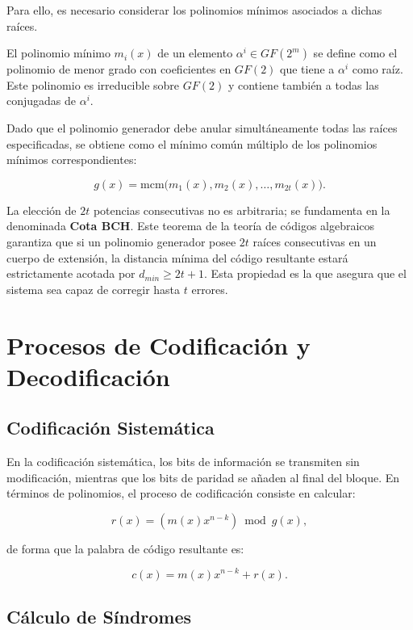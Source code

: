 Para ello, es necesario considerar los polinomios mínimos asociados a dichas raíces.

El polinomio mínimo \(m_i(x)\) de un elemento \(\alpha^i \in GF(2^m)\) se define como el polinomio de menor grado con coeficientes en \(GF(2)\) que tiene a \(\alpha^i\) como raíz. Este polinomio es irreducible sobre \(GF(2)\) y contiene también a todas las conjugadas de \(\alpha^i\).

Dado que el polinomio generador debe anular simultáneamente todas las raíces especificadas, se obtiene como el mínimo común múltiplo de los polinomios mínimos correspondientes:

\begin{equation}
g(x) = \mathrm{mcm}\big(m_1(x), m_2(x), \dots, m_{2t}(x)\big).
\end{equation}

La elección de $2t$ potencias consecutivas no es arbitraria; se fundamenta en la denominada \textbf{Cota BCH}. Este teorema de la teoría de códigos algebraicos garantiza que si un polinomio generador posee $2t$ raíces consecutivas en un cuerpo de extensión, la distancia mínima del código resultante estará estrictamente acotada por $d_{min} \geq 2t + 1$. Esta propiedad es la que asegura que el sistema sea capaz de corregir hasta $t$ errores.

\section{Procesos de Codificación y Decodificación}
\label{sec:procesos_codec}

\subsection{Codificación Sistemática}

En la codificación sistemática, los bits de información se transmiten sin modificación, mientras que los bits de paridad se añaden al final del bloque. En términos de polinomios, el proceso de codificación consiste en calcular:

\[
r(x) = (m(x)x^{n-k}) \bmod g(x),
\]

de forma que la palabra de código resultante es:

\[
c(x) = m(x)x^{n-k} + r(x).
\]

\subsection{Cálculo de Síndromes}

